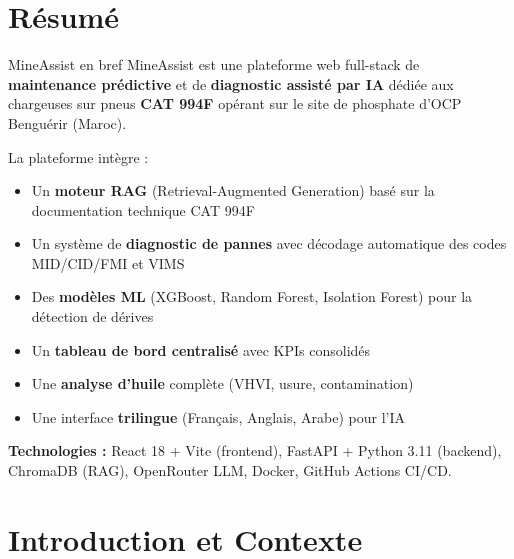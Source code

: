 \documentclass[12pt,a4paper]{report}
\begin{document}
\pagecolor{white}\color{black}

\chapter*{Résumé}

\begin{infobox}{MineAssist en bref}
MineAssist est une plateforme web full-stack de \textbf{maintenance prédictive} et de \textbf{diagnostic assisté par IA}
dédiée aux chargeuses sur pneus \textbf{CAT 994F} opérant sur le site de phosphate d'OCP Benguérir (Maroc).
\end{infobox}

\vspace{1em}
La plateforme intègre :
\begin{itemize}[leftmargin=1.5cm]
  \item Un \textbf{moteur RAG} (Retrieval-Augmented Generation) basé sur la documentation technique CAT 994F
  \item Un système de \textbf{diagnostic de pannes} avec décodage automatique des codes MID/CID/FMI et VIMS
  \item Des \textbf{modèles ML} (XGBoost, Random Forest, Isolation Forest) pour la détection de dérives
  \item Un \textbf{tableau de bord centralisé} avec KPIs consolidés
  \item Une \textbf{analyse d'huile} complète (VHVI, usure, contamination)
  \item Une interface \textbf{trilingue} (Français, Anglais, Arabe) pour l'IA
\end{itemize}

\vspace{1em}
\textbf{Technologies :} React 18 + Vite (frontend), FastAPI + Python 3.11 (backend), ChromaDB (RAG), OpenRouter LLM, Docker, GitHub Actions CI/CD.

\clearpage

\tableofcontents
\clearpage

\chapter{Introduction et Contexte}
\end{document}

